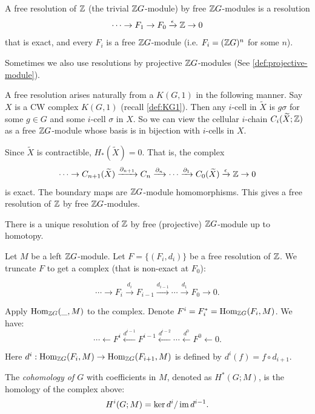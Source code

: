 \begin{definition}
    \label{def:resolution-free-ZG-module}
    A free resolution of \(\Z\) (the trivial \(\Z G\)-module) by free \(\Z G\)-modules is a resolution
    \[ \cdots\to F_1 \to F_0 \xrightarrow{\epsilon} \Z \to 0\]
    that is exact, and every \(F_i\) is a free \(\Z G\)-module (i.e. \(F_i = (\Z G)^n\) for some \(n\)).
\end{definition}


Sometimes we also use resolutions by projective \(\Z G\)-modules (See \cref{def:projective-module}).

\begin{remark}
    \label{rmk:free-resolution-arises-naturally}
    A free resolution arises naturally from a \(K(G,1)\) in the following manner. Say \(X\) is a CW complex \(K(G,1)\) (recall \cref{def:KG1}). Then any \(i\)-cell in \(\tilde X\) is \(g\sigma\) for some \(g\in G\) and  some \(i\)-cell \(\sigma \) in \(X\). So we can view the cellular \(i\)-chain \(C_i(\tilde X; \Z)\) as a free \(\Z G\)-module whose basis is in bijection with \(i\)-cells in \(X\). 

    Since \(\tilde X\) is contractible, \(H_*(\tilde X) =0\). That is, the complex
    \[
    \cdots \to C_{n+1} (\tilde X) \xrightarrow{\partial_{n+1}} C_n \xrightarrow{\partial_n} \cdots \xrightarrow{\partial_1} C_0(\tilde X) \xrightarrow{\epsilon} \Z \to 0
    \]
    is exact. The boundary maps are \(\Z G\)-module homomorphisms. This gives a free resolution of \(\Z\) by free \(\Z G\)-modules.
\end{remark}


\begin{theorem}
    \label{thm:unique-resolution-up-to-homotopy}
    There is a unique resolution of \(\Z\) by free (projective) \(\Z G\)-module up to homotopy.
\end{theorem}


\begin{definition}
    \label{def:cohomology-of-group}
    Let \(M\) be a left \(\Z G\)-module. Let \(F = \{(F_i, d_i)\}\) be a free resolution of \(\Z\). We truncate \(F\)  to get a complex (that is non-exact at $F_0$):
   
     \[ 
       \cdots \rightarrow F_i \xrightarrow{d_i} F_{i-1} \xrightarrow{d_{i-1}}\cdots \xrightarrow{d_1} F_0 \to 0 .
    \]

    Apply \(\Hom{\_}{M}{\Z G}\) to the complex. Denote \(F^i = F_i^* =  \Hom{F_i }{M }{\Z G}\). We have:
    \[ 
       \cdots \leftarrow F^i \xleftarrow{d^{i-1}} F^{i-1} \xleftarrow{d^{i-2}}\cdots \xleftarrow{d^0} F^0 \xleftarrow{} 0 .
    \]

    Here \(d^{i} : \Hom{F_i}{M}{\Z G} \to \Hom{F_{i+1}}{M}{\Z G} \) is defined by \(d^i(f) = f\circ d_{i+1}\).

    The \emph{cohomology of \(G\)} with coefficients in \(M\), denoted as \(H^*(G;M)\), is the homology of the complex above: 
    \[ H^i(G;M) = \ker d^i/\im d^{i-1} .\]
\end{definition}

